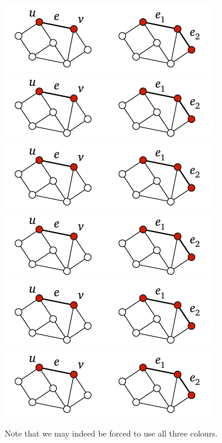\begin{center}
    \includegraphics[page=\PIntroIdC]{figs.pdf}\\
    \includegraphics[page=\PIntroIdCC]{figs.pdf}\\
    \includegraphics[page=\PIntroIdD]{figs.pdf}\\
    \includegraphics[page=\PIntroIdDD]{figs.pdf}\\
    \includegraphics[page=\PIntroIdE]{figs.pdf}\\
    \includegraphics[page=\PIntroIdEE]{figs.pdf}
\end{center}
Note that we may indeed be forced to use all three colours.

